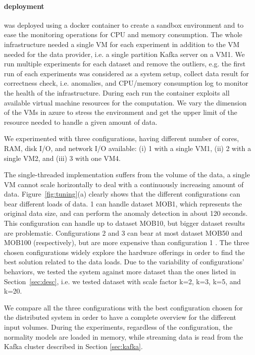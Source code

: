 {\paragraph{\sti{} deployment}
\sti{} was deployed using a docker container to create a sandbox environment and to ease the monitoring operations for CPU and memory consumption. The whole infrastructure needed a single VM for each experiment in addition to the VM needed for the data provider,  i.e. a single partition Kafka server on a VM1.
We run multiple experiments for each dataset and remove the outliers, e.g. the first run of each experiments was considered as a system setup, collect data result for correctness check, i.e. anomalies, and CPU/memory consumption log to monitor the health of the infrastructure. During each run the container exploits all available virtual machine resources for the computation. We vary the dimension of the VMs in azure to stress the environment and get the upper limit of the resource needed to handle a given amount of data.

We experimented with three configurations, having different number of cores, RAM, disk I/O, and network I/O available: (i) \sti{}1 with a single VM1, (ii) \sti{}2 with a single VM2, and (iii) \sti{}3 with one VM4.

The single-threaded implementation suffers from the volume of the data, a single VM cannot scale horizontally to deal with a continuously increasing amount of data. 
Figure~\ref{fig:tuning}(a) clearly shows that the different configurations can bear different loads of data.
\sti{}1 can handle dataset MOB1, which represents the original data size, and can perform the anomaly detection in about 120 seconds. This configuration can handle up to dataset MOB10, but bigger dataset results are problematic. Configurations \sti{}2 and \sti{}3 can bear at most dataset MOB50 and MOB100  (respectively), but are more expensive than configuration \sti{}1 .
The three chosen configurations widely explore the hardware offerings in order to find the best solution related to the data loads. Due to the variability of configurations' behaviors, we tested the system against more dataset than the ones listed in Section~\ref{sec:desc}, i.e. we tested dataset with scale factor k=2, k=3, k=5, and k=20.

We compare all the three \sti{} configurations with the best configuration chosen for the distributed system in order to have a complete overview for the different input volumes. During the experiments, regardless of the \sti{} configuration, the normality models are loaded in memory, while streaming data is read from the Kafka cluster described in Section \ref{sec:kafka}.

}
